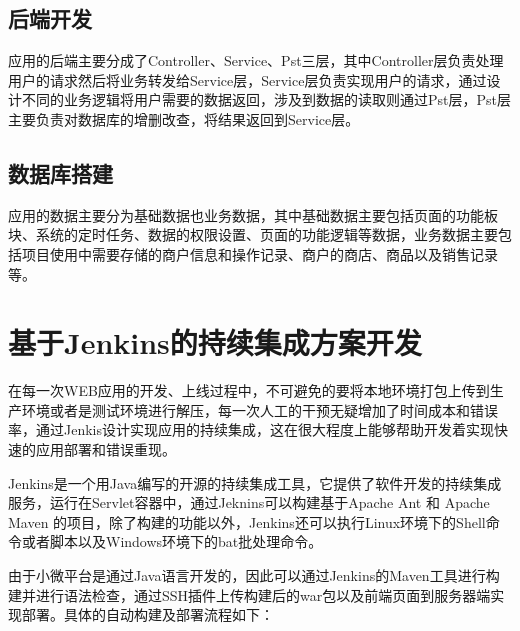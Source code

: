 \subsection{后端开发}
应用的后端主要分成了Controller、Service、Pst三层，其中Controller层负责处理用户的请求然后将业务转发给Service层，Service层负责实现用户的请求，通过设计不同的业务逻辑将用户需要的数据返回，涉及到数据的读取则通过Pst层，Pst层主要负责对数据库的增删改查，将结果返回到Service层。
\subsection{数据库搭建}
应用的数据主要分为基础数据也业务数据，其中基础数据主要包括页面的功能板块、系统的定时任务、数据的权限设置、页面的功能逻辑等数据，业务数据主要包括项目使用中需要存储的商户信息和操作记录、商户的商店、商品以及销售记录等。
\section{基于Jenkins的持续集成方案开发}
在每一次WEB应用的开发、上线过程中，不可避免的要将本地环境打包上传到生产环境或者是测试环境进行解压，每一次人工的干预无疑增加了时间成本和错误率，通过Jenkis设计实现应用的持续集成，这在很大程度上能够帮助开发着实现快速的应用部署和错误重现\cite{高珺2015以持续集成方式进行系统自动化部署}。

Jenkins是一个用Java编写的开源的持续集成工具，它提供了软件开发的持续集成服务，运行在Servlet容器中，通过Jeknins可以构建基于Apache Ant 和 Apache Maven 的项目，除了构建的功能以外，Jenkins还可以执行Linux环境下的Shell命令或者脚本以及Windows环境下的bat批处理命令\cite{王宁2014基于}。

由于小微平台是通过Java语言开发的，因此可以通过Jenkins的Maven工具进行构建并进行语法检查，通过SSH插件上传构建后的war包以及前端页面到服务器端实现部署\cite{赵亚楠2013基于}。具体的自动构建及部署流程如下：
